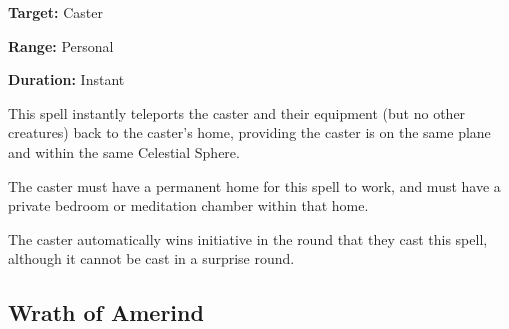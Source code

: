 \begin{multicols*}{2}
{\textbf{Target:} Caster

\textbf{Range:} Personal

\textbf{Duration:} Instant}

This spell instantly teleports the caster and their equipment (but no other creatures) back to the caster’s home, providing the caster is on the same plane and within the same Celestial Sphere.

The caster must have a permanent home for this spell to work, and must have a private bedroom or meditation chamber within that home.

The caster automatically wins initiative in the round that they cast this spell, although it cannot be cast in a surprise round.

\subsection{Wrath of Amerind}\label{spell:Wrath of Amerind}


\end{multicols*}

